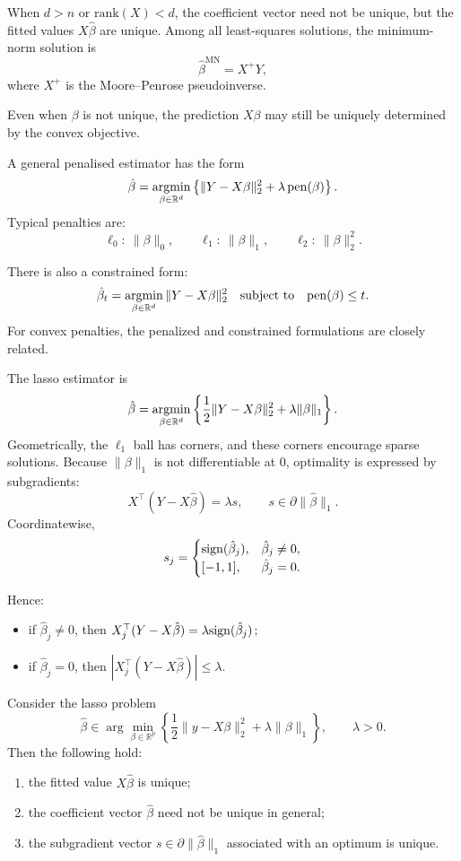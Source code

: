 When $d>n$ or $\mathrm{rank}(X)<d$, the coefficient vector need not be unique, but the fitted values $X\hat\beta$ are unique.  
Among all least-squares solutions, the minimum-norm solution is
\[
\hat\beta^{\mathrm{MN}} = X^+Y,
\]
where $X^+$ is the Moore--Penrose pseudoinverse.

\begin{remark}
Even when $\beta$ is not unique, the prediction $X\beta$ may still be uniquely determined by the convex objective.
\end{remark}

A general penalised estimator has the form
\[
\hat\beta
=
\argmin_{\beta\in\R^d}
\left\{
\|Y-X\beta\|_2^2 + \lambda\,\mathrm{pen}(\beta)
\right\}.
\]
Typical penalties are:
\[
\ell_0:\ \|\beta\|_0,
\qquad
\ell_1:\ \|\beta\|_1,
\qquad
\ell_2:\ \|\beta\|_2^2.
\]
\begin{remark}
    There is also a constrained form:
\[
\hat\beta_t
=
\argmin_{\beta\in\R^d}
\|Y-X\beta\|_2^2
\quad\text{subject to}\quad
\mathrm{pen}(\beta)\le t.
\]
For convex penalties, the penalized and constrained formulations are closely related.
\end{remark}


The lasso estimator is
\[
\hat\beta
=
\argmin_{\beta\in\R^d}
\left\{
\frac{1}{2}\|Y-X\beta\|_2^2 + \lambda\|\beta\|_1
\right\}.
\]
Geometrically, the $\ell_1$ ball has corners, and these corners encourage sparse solutions. Because $\|\beta\|_1$ is not differentiable at $0$, optimality is expressed by subgradients:
\[
X^\top(Y-X\hat\beta)=\lambda s,
\qquad
s\in\partial\|\hat\beta\|_1.
\]
Coordinatewise,
\[
s_j=
\begin{cases}
\mathrm{sign}(\hat\beta_j), & \hat\beta_j\neq 0,\\
[-1,1], & \hat\beta_j=0.
\end{cases}
\]

Hence:
\begin{itemize}[leftmargin=2em]
    \item if $\hat\beta_j\neq 0$, then $X_j^\top(Y-X\hat\beta)=\lambda\mathrm{sign}(\hat\beta_j)$;
    \item if $\hat\beta_j=0$, then $|X_j^\top(Y-X\hat\beta)|\le \lambda$.
\end{itemize}


\begin{prop}
Consider the lasso problem
\[
\hat\beta \in \arg\min_{\beta\in\mathbb{R}^p}
\left\{
\frac12\|y-X\beta\|_2^2+\lambda\|\beta\|_1
\right\},
\qquad \lambda>0.
\]
Then the following hold:
\begin{enumerate}
    \item the fitted value $X\hat\beta$ is unique;
    \item the coefficient vector $\hat\beta$ need not be unique in general;
    \item the subgradient vector $s\in\partial \|\hat\beta\|_1$ associated with an optimum is unique.
\end{enumerate}
\end{prop}

